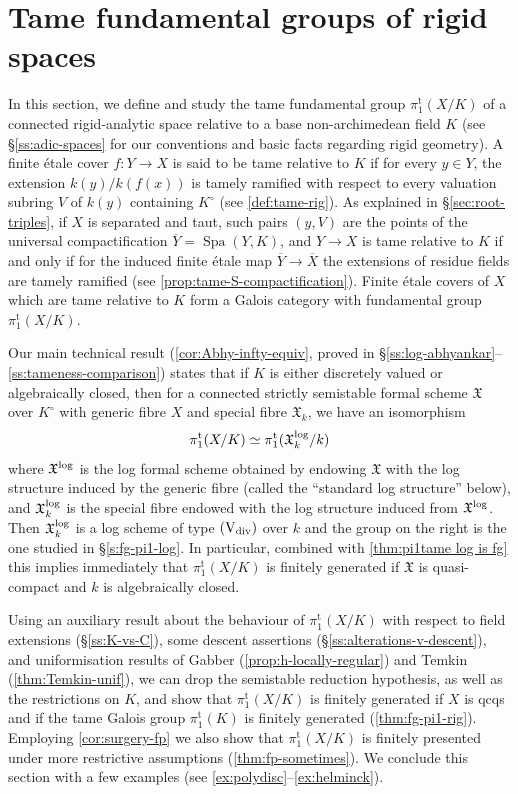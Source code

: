 \documentclass[a4paper,twoside,11pt,reqno]{amsart}
\newcommand{\fX}{{\mathfrak{X}}}
\DeclareMathOperator{\Spa}{Spa}
\newcommand{\typeVd}{(\mathrm{V}_{\rm div})}
\newcommand{\pitame}{\pi_1^{\mathrm{t}}}
\theoremstyle{definition}
\numberwithin{equation}{subsection}
\begin{document}
\section{Tame fundamental groups of rigid spaces}
\label{s:fg-pi1-rig}


In this section, we define and study the tame fundamental group $\pitame(X/K)$ of a connected rigid-analytic space relative to a base non-archimedean field $K$ (see \S\ref{ss:adic-spaces} for our conventions and basic facts regarding rigid geometry). A finite \'etale cover $f\colon Y\to X$ is said to be tame relative to $K$ if for every $y\in Y$, the extension $k(y)/k(f(x))$ is tamely ramified with respect to every valuation subring $V$ of $k(y)$ containing $K^\circ$ (see \cref{def:tame-rig}). As explained in \S\ref{sec:root-triples}, if $X$ is separated and taut, such pairs $(y,V)$ are the points of the universal compactification $\overline{Y} = \Spa(Y, K)$, and $Y\to X$ is tame relative to $K$ if and only if for the induced finite \'etale map $\overline{Y}\to \overline{X}$ the extensions of residue fields are tamely ramified (see \cref{prop:tame-S-compactification}). Finite \'etale covers of $X$ which are tame relative to $K$ form a Galois category with fundamental group~$\pitame(X/K)$.

Our main technical result (\cref{cor:Abhy-infty-equiv}, proved in \S\ref{ss:log-abhyankar}--\ref{ss:tameness-comparison}) states that if $K$ is either discretely valued or algebraically closed, then for a connected strictly semistable formal scheme $\fX$ over $K^\circ$ with generic fibre $X$ and special fibre $\fX_k$, we have an isomorphism
\[
    \pitame(X/K) \simeq \pitame(\fX^{\rm log}_k/k)
\]
where $\fX^{\rm log}$ is the log formal scheme obtained by endowing $\fX$ with the log structure induced by the generic fibre (called the ``standard log structure'' below), and $\fX^{\rm log}_k$ is the special fibre endowed with the log structure induced from $\fX^{\rm log}$. Then $\fX^{\rm log}_k$ is a log scheme of type $\typeVd$ over $k$ and the group on the right is the one studied in \S\ref{s:fg-pi1-log}. In particular, combined with \cref{thm:pi1tame log is fg} this implies immediately that $\pitame(X/K)$ is finitely generated if $\fX$ is quasi-compact and $k$ is algebraically closed. 

Using an auxiliary result about the behaviour of $\pitame(X/K)$ with respect to field extensions (\S\ref{ss:K-vs-C}), some descent assertions (\S\ref{ss:alterations-v-descent}), and uniformisation results of Gabber (\cref{prop:h-locally-regular}) and Temkin (\cref{thm:Temkin-unif}), we can drop the semistable reduction hypothesis, as well as the restrictions on $K$, and show that $\pitame(X/K)$ is finitely generated if $X$ is qcqs and if the tame Galois group $\pitame(K)$ is finitely generated (\cref{thm:fg-pi1-rig}). Employing \cref{cor:surgery-fp} we also show that $\pitame(X/K)$ is finitely presented under more restrictive assumptions (\cref{thm:fp-sometimes}). We conclude this section with a few examples (see \cref{ex:polydisc}--\cref{ex:helminck}).
\end{document}
